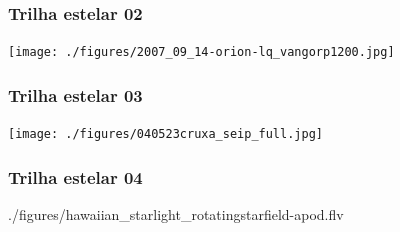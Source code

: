 \begin{frame}
  \frametitle{Trilha estelar 02}
  \begin{center}
    \texttt{[image: ./figures/2007\_09\_14-orion-lq\_vangorp1200.jpg]}
  \end{center}
\end{frame}


\begin{frame}
  \frametitle{Trilha estelar 03}
  \begin{center}
    \texttt{[image: ./figures/040523cruxa\_seip\_full.jpg]}
  \end{center}
\end{frame}


\begin{frame}
  \frametitle{Trilha estelar 04}
  \begin{center}
  {./figures/hawaiian_starlight_rotatingstarfield-apod.flv}
  \end{center}
\end{frame}

